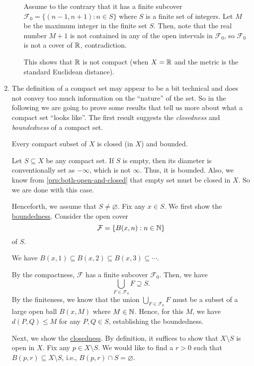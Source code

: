 \begin{enumerate}
\begin{itemize}
\begin{pf}
Assume to the contrary that it has a finite subcover
\(\mathcal{F}_0=\{(n-1,n+1):n\in S\}\) where \(S\) is a finite set of integers.
Let \(M\) be the maximum integer in the finite set \(S\). Then, note that the
real number \(M+1\) is not contained in any of the open intervals in
\(\mathcal{F}_0\), so \(\mathcal{F}_0\) is not a cover of \(\mathbb{R}\),
contradiction.
\end{pf}

This shows that \(\mathbb{R}\) is not compact (when \(X=\mathbb{R}\) and the metric is the
standard Euclidean distance).
\end{itemize}

\item The definition of a compact set may appear to be a bit technical and does
not convey too much information on the ``nature'' of the set. So in the
following we are going to prove some results that tell us more about what a
compact set ``looks like''. The first result suggests the \emph{closedness} and
\emph{boundedness} of a compact set.

\begin{theorem}
\label{thm:compact-imp-closed-bounded}
Every compact subset of \(X\) is closed (in \(X\)) and bounded.
\end{theorem}
\begin{pf}
Let \(S\subseteq X\) be any compact set. If \(S\) is empty, then its diameter
is conventionally set as \(-\infty\), which is not \(\infty\). Thus, it is
bounded. Also, we know from \cref{prp:both-open-and-closed} that empty set must
be closed in \(X\). So we are done with this case.

Henceforth, we assume that \(S\ne\varnothing\). Fix any \(x\in S\). We first
show the \underline{boundedness}. Consider the open cover
\[
\mathcal{F}=\{B(x,n):n\in\mathbb{N}\}
\]
of \(S\). \begin{note}
We have \(B(x,1)\subseteq B(x,2)\subseteq B(x,3)\subseteq \dotsb\).
\end{note}
By the compactness, \(\mathcal{F}\) has a finite subcover \(\mathcal{F}_0\).
Then, we have
\[
\bigcup_{F\in\mathcal{F}_0}F\supseteq S.
\]
By the finiteness, we know that the union \(\displaystyle
\bigcup_{F\in\mathcal{F}_0}F\) must be a subset of a large open ball
\(B(x,M)\) where \(M\in\mathbb{N}\). Hence, for this \(M\), we have \(d(P,Q)\le
M\) for any \(P,Q\in S\), establishing the boundedness.

Next, we show the \underline{closedness}. By definition, it suffices to show
that \(X\setminus S\) is open in \(X\). Fix any \(p\in X\setminus S\). We would
like to find a \(r>0\) such that \(B(p,r)\subseteq X\setminus S\), i.e.,
\(B(p,r)\cap S=\varnothing\).


\end{pf}
\end{enumerate}
